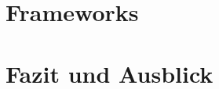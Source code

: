 \documentclass[runningheads]{llncs}
\begin{document}
\section{Frameworks}
\label{sec:Evaluation}



\section{Fazit und Ausblick}
\label{sec:Fazit}



%

\newpage

\end{document}
